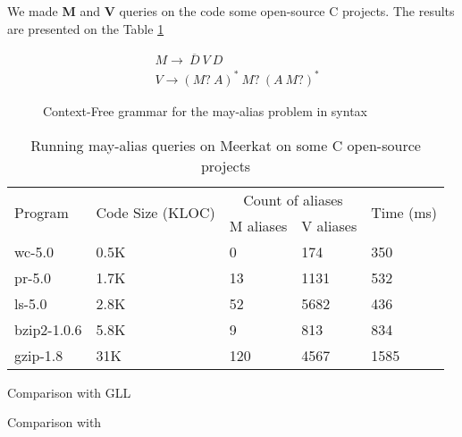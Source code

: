We made \textbf{M} and \textbf{V} queries on the code some open-source C projects. The results are presented on the Table \ref{table:staticAnalysis} 

\begin{figure}[t]
\begin{align*}
& M \rightarrow\ \overline{D}\ V\ D\\
& V \rightarrow (M ?\ A)^{*} \ M?\ (A\ M?)^{*}
\end{align*}
\caption{Context-Free grammar for the may-alias problem in syntax}
\label{lst:aliasGrammar}
\end{figure}



\begin{table}[t]
\centering
\begin{tabular}{|l|l|ll|l|}
\hline
\multirow{2}{*}{Program} & \multirow{2}{*}{Code Size (KLOC)} & \multicolumn{2}{c|}{Count of aliases} & \multirow{2}{*}{Time (ms)} \\ \cline{3-4}
 &  & \multicolumn{1}{c|}{M aliases} & \multicolumn{1}{c|}{V aliases} &  \\ 
\hline
\hline
wc-5.0      & 0.5K & 0   & 174  & 350 \\
pr-5.0      & 1.7K & 13  & 1131 & 532 \\
ls-5.0      & 2.8K & 52  & 5682 & 436 \\
bzip2-1.0.6 & 5.8K & 9   & 813  & 834 \\
gzip-1.8    & 31K  & 120 & 4567 & 1585\\
\hline
\end{tabular}
\caption{Running may-alias queries on Meerkat on some C open-source projects}
\label{table:staticAnalysis}
\end{table}


Comparison with GLL

Comparison with ~\cite{ScalaGraphParsing}